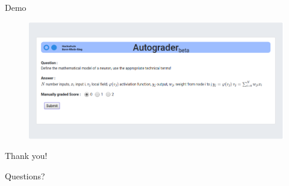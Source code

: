 \documentclass{beamer}
\begin{document}
\begin{frame}{Demo}
\begin{center}	
	\begin{figure}[!htb]
		\centering
		\includegraphics[scale=0.28]{images/gui_1}
		\label{gui_architecture}
	\end{figure}
\end{center}
\end{frame}

\begin{frame}{Thank you!}
	\begin{center}
		Questions?
	\end{center}
\end{frame}
\end{document}
